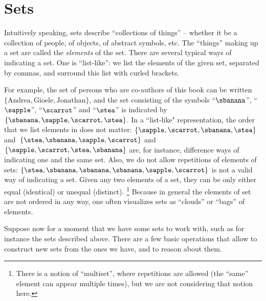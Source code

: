 

\section{Sets}


Intuitively speaking, sets describe ``collections of things'' -- whether it be a collection of people, of objects, of abstract symbols, etc.
The ``things'' making up a set are called the \emph{elements} of the set.
There are several typical ways of indicating a set.
One is ``list-like'': we list the elements of the given set, separated by commas, and surround this list with curled brackets.


For example, the set of persons who are co-authors of this book can be written~$\{ \text{Andrea}, \text{Gioele}, \text{Jonathan} \}$, and the set consisting of the symbols ``$\sbanana$'', ``$\sapple$'', ``$\scarrot$'' and ``$\stea$'' is indicated by $\{ \sbanana, \sapple, \scarrot, \stea \}$.
In a ``list-like" representation, the order that we list elements in does not matter:
$\{ \sapple, \scarrot, \sbanana, \stea \}$ and~$\{ \stea, \sbanana, \sapple, \scarrot\}$ and~$\{ \sapple, \scarrot, \stea, \sbanana \}$ are, for instance, difference ways of indicating one and the same set.
Also, we do not allow repetitions of elements of sets:
$\{ \stea, \sbanana, \sbanana, \sbanana, \sapple, \scarrot \}$ is not a valid way of indicating a set.
Given any two elements of a set, they can be only either equal (identical) or unequal (distinct).
\footnote{There is a notion of ``multiset'', where repetitions are allowed (the ``same'' element can appear multiple times), but we are not considering that notion here.}
Because in general the elements of set are not ordered in any way, one often visualizes sets as ``clouds'' or ``bags'' of elements.


Suppose now for a moment that we have some sets to work with, such as for instance the sets described above.
There are a few basic operations that allow to construct new sets from the ones we have, and to reason about them.


